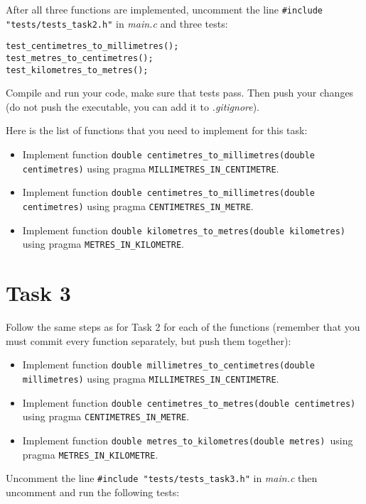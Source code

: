\documentclass{article}
\begin{document}
After all three functions are implemented, uncomment the line \lstinline{#include "tests/tests_task2.h"} in \emph{main.c} and three tests:

\begin{lstlisting}
test_centimetres_to_millimetres();
test_metres_to_centimetres();
test_kilometres_to_metres();
\end{lstlisting}

Compile and run your code, make sure that tests pass. Then push your changes (do not push the executable, you can add it to \emph{.gitignore}).

Here is the list of functions that you need to implement for this task:

\begin{itemize}
\item Implement function \lstinline{double centimetres_to_millimetres(double centimetres)} using pragma \lstinline{MILLIMETRES_IN_CENTIMETRE}.
\item Implement function \lstinline{double centimetres_to_millimetres(double centimetres)} using pragma \lstinline{CENTIMETRES_IN_METRE}.
\item Implement function \lstinline{double kilometres_to_metres(double kilometres)} using pragma \lstinline{METRES_IN_KILOMETRE}.
\end{itemize}

\section*{Task 3}

Follow the same steps as for Task 2 for each of the functions (remember that you must commit every function separately, but push them together):

\begin{itemize}
\item Implement function \lstinline{double millimetres_to_centimetres(double millimetres)} using pragma \lstinline{MILLIMETRES_IN_CENTIMETRE}.
\item Implement function \lstinline{double centimetres_to_metres(double centimetres)} using pragma \lstinline{CENTIMETRES_IN_METRE}.
\item Implement function \lstinline{double metres_to_kilometres(double metres) }using pragma \lstinline{METRES_IN_KILOMETRE}.
\end{itemize}

Uncomment the line \lstinline{#include "tests/tests_task3.h"} in \emph{main.c} then uncomment and run the following tests:
\end{document}
